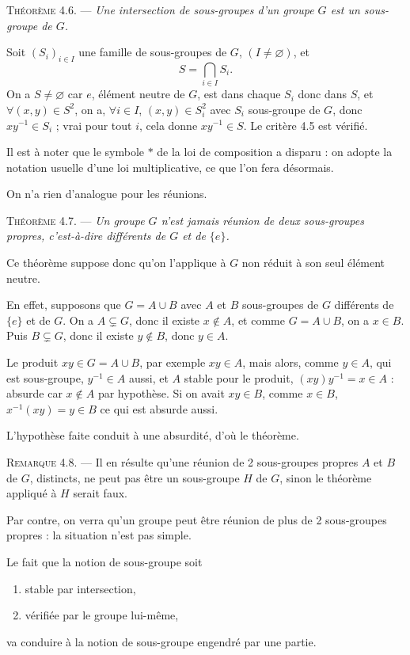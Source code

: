 \medskip\noindent\textsc{Théorème 4.6.} --- \emph{Une intersection de sous-groupes d'un groupe $G$ est un sous-groupe de $G$.}

Soit $(S_i)_{i\in I}$ une famille de sous-groupes de $G$, $(I\ne\varnothing)$, et
\[
S=\bigcap_{i\in I}S_i.
\]
On a $S\ne\varnothing$ car $e$, élément neutre de $G$, est dans chaque $S_i$ donc dans $S$, et $\forall(x,y)\in S^2$, on a, $\forall i\in I$, $(x,y)\in S_i^2$ avec $S_i$ sous-groupe de $G$, donc $xy^{-1}\in S_i$ ; vrai pour tout $i$, cela donne $xy^{-1}\in S$. Le critère 4.5 est vérifié. \bookend

Il est à noter que le symbole $*$ de la loi de composition a disparu : on adopte la notation usuelle d'une loi multiplicative, ce que l'on fera désormais.

On n'a rien d'analogue pour les réunions.

\medskip\noindent\textsc{Théorème 4.7.} --- \emph{Un groupe $G$ n'est jamais réunion de deux sous-groupes propres, c'est-à-dire différents de $G$ et de $\{e\}$.}

Ce théorème suppose donc qu'on l'applique à $G$ non réduit à son seul élément neutre.

En effet, supposons que $G=A\cup B$ avec $A$ et $B$ sous-groupes de $G$ différents de $\{e\}$ et de $G$. On a $A\subsetneq G$, donc il existe $x\notin A$, et comme $G=A\cup B$, on a $x\in B$. Puis $B\subsetneq G$, donc il existe $y\notin B$, donc $y\in A$.

Le produit $xy\in G=A\cup B$, par exemple $xy\in A$, mais alors, comme $y\in A$, qui est sous-groupe, $y^{-1}\in A$ aussi, et $A$ stable pour le produit, $(xy)y^{-1}=x\in A$ : absurde car $x\notin A$ par hypothèse. Si on avait $xy\in B$, comme $x\in B$, $x^{-1}(xy)=y\in B$ ce qui est absurde aussi.

L'hypothèse faite conduit à une absurdité, d'où le théorème. \bookend

\medskip\noindent\textsc{Remarque 4.8.} --- Il en résulte qu'une réunion de 2 sous-groupes propres $A$ et $B$ de $G$, distincts, ne peut pas être un sous-groupe $H$ de $G$, sinon le théorème appliqué à $H$ serait faux.

Par contre, on verra qu'un groupe peut être réunion de plus de 2 sous-groupes propres : la situation n'est pas simple.

Le fait que la notion de sous-groupe soit
\begin{enumerate}[label=\arabic*),leftmargin=2.1em]
\item stable par intersection,
\item vérifiée par le groupe lui-même,
\end{enumerate}
va conduire à la notion de sous-groupe engendré par une partie.

